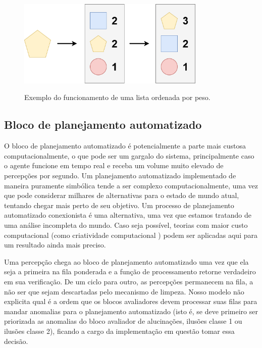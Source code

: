 \begin{figure}[h!]
    \centering
    \caption{Exemplo do funcionamento de uma lista ordenada por peso.}
    \includegraphics[width=0.8\textwidth]{images/filaPonderada.png}
    \label{filaPonderada}
\end{figure}

\subsection{Bloco de planejamento automatizado}

O bloco de planejamento automatizado é potencialmente a parte mais custosa computacionalmente, o que pode ser um gargalo do sistema, principalmente caso o agente funcione em tempo real e receba um volume muito elevado de percepções por segundo. Um planejamento automatizado implementado de maneira puramente simbólica tende a ser complexo computacionalmente, uma vez que pode considerar milhares de alternativas para o estado de mundo atual, tentando chegar mais perto de seu objetivo. Um processo de planejamento automatizado conexionista é uma alternativa, uma vez que estamos tratando de uma análise incompleta do mundo. Caso seja possível, teorias com maior custo computacional (como criatividade computacional \cite{colton2012computational}) podem ser aplicadas aqui para um resultado ainda mais preciso.

Uma percepção chega ao bloco de planejamento automatizado uma vez que ela seja a primeira na fila ponderada e a função de processamento retorne verdadeiro em sua verificação. De um ciclo para outro, as percepções permanecem na fila, a não ser que sejam descartadas pelo mecanismo de limpeza. Nosso modelo não explicita qual é a ordem que os blocos avaliadores devem processar suas filas para mandar anomalias para o planejamento automatizado (isto é, se deve primeiro ser priorizada as anomalias do bloco avaliador de alucinações, ilusões classe 1 ou ilusões classe 2), ficando a cargo da implementação em questão tomar essa decisão.

